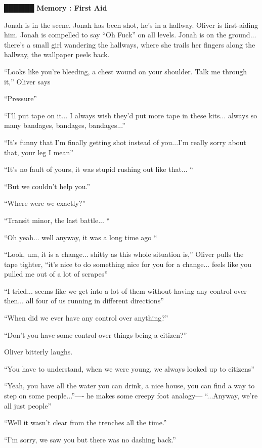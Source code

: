  {\LARGE \textbf{ {\color[RGB]{51,51,51}██████} } }  {\LARGE \textbf{ Memory : First Aid} } 

Jonah is in the scene.  Jonah has been shot, he's in a hallway.  Oliver is first-aiding him. Jonah is compelled to say ``Oh Fuck'' on all levels.  Jonah is on the ground... there's a small girl wandering the hallways, where she trails her fingers along the hallway, the wallpaper peels back. 

``Looks like you're bleeding, a chest wound on your shoulder.  Talk me through it,'' Oliver says

``Pressure''

``I'll put tape on it... I always wish they'd put more tape in these kits... always so many bandages, bandages, bandages...''

``It's funny that I'm finally getting shot instead of you...I'm really sorry about that, your leg I mean''

``It's no fault of yours, it was stupid rushing out like that... ``

``But we couldn't help you.''

``Where were we exactly?''

``Transit minor, the last battle...  ``

``Oh yeah... well anyway, it was a long time ago ``

``Look, um, it is a change... shitty as this whole situation is,'' Oliver pulls the tape tighter, ``it's nice to do something nice for you for a change... feels like you pulled me out of a lot of scrapes''

``I tried... seems like we get into a lot of them without having any control over then... all four of us running in different directions''

``When did we ever have any control over anything?''

``Don't you have some control over things being a citizen?''

Oliver bitterly laughs. 

``You have to understand, when we were young, we always looked up to citizens''

``Yeah, you have all the water you can drink, a nice house, you can find a way to step on some people...''---- he makes some creepy foot analogy--- ``...Anyway, we're all just people''

``Well it wasn't clear from the trenches all the time.''

``I'm sorry, we saw you but there was no dashing back.''

